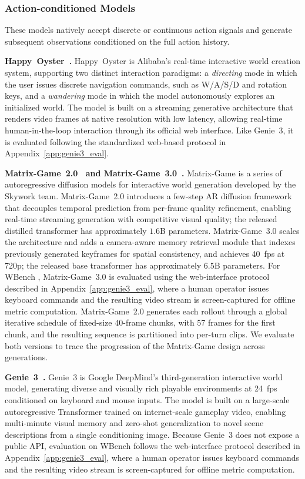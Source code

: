 \documentclass{llmxive}
\providecommand{\myparagraph}[1]{\vspace{-0.1em}\noindent\textbf{#1}\hspace{0.3em}}
\providecommand{\benchmark}{WBench }
\begin{document}
\subsubsection{Action-conditioned Models}

These models natively accept discrete or continuous action signals and generate subsequent observations conditioned on the full action history.

\myparagraph{Happy~Oyster~\cite{alibaba2026happyoyster}.}
Happy~Oyster is Alibaba's real-time interactive world creation system, supporting two distinct interaction paradigms: a \emph{directing} mode in which the user issues discrete navigation commands, such as W/A/S/D and rotation keys, and a \emph{wandering} mode in which the model autonomously explores an initialized world.
The model is built on a streaming generative architecture that renders video frames at native resolution with low latency, allowing real-time human-in-the-loop interaction through its official web interface.
Like Genie~3, it is evaluated following the standardized web-based protocol in Appendix~\ref{app:genie3_eval}.

\myparagraph{Matrix-Game~2.0~\cite{he2025matrixgame2} and Matrix-Game~3.0~\cite{he2026matrixgame3}.}
Matrix-Game is a series of autoregressive diffusion models for interactive world generation developed by the Skywork team.
Matrix-Game~2.0 introduces a few-step AR diffusion framework that decouples temporal prediction from per-frame quality refinement, enabling real-time streaming generation with competitive visual quality; the released distilled transformer has approximately $1.6$B parameters.
Matrix-Game~3.0 scales the architecture and adds a camera-aware memory retrieval module that indexes previously generated keyframes for spatial consistency, and achieves 40~fps at 720p; the released base transformer has approximately $6.5$B parameters.
For \benchmark, Matrix-Game~3.0 is evaluated using the web-interface protocol described in Appendix~\ref{app:genie3_eval}, where a human operator issues keyboard commands and the resulting video stream is screen-captured for offline metric computation.
Matrix-Game~2.0 generates each rollout through a global iterative schedule of fixed-size $40$-frame chunks, with $57$ frames for the first chunk, and the resulting sequence is partitioned into per-turn clips.
We evaluate both versions to trace the progression of the Matrix-Game design across generations.

\myparagraph{Genie~3~\cite{ball2025genie3}.}
Genie~3 is Google DeepMind's third-generation interactive world model, generating diverse and visually rich playable environments at 24~fps conditioned on keyboard and mouse inputs.
The model is built on a large-scale autoregressive Transformer trained on internet-scale gameplay video, enabling multi-minute visual memory and zero-shot generalization to novel scene descriptions from a single conditioning image.
Because Genie~3 does not expose a public API, evaluation on \benchmark follows the web-interface protocol described in Appendix~\ref{app:genie3_eval}, where a human operator issues keyboard commands and the resulting video stream is screen-captured for offline metric computation.
\end{document}
